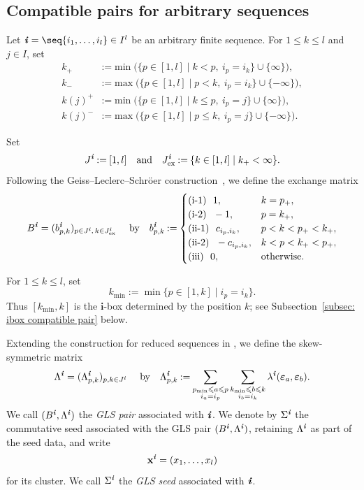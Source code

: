 \documentclass[12pt, leqno]{amsart}
\numberwithin{equation}{section}
\theoremstyle{plain}
\theoremstyle{definition}
\renewcommand{\le}{\leqslant}
\newcommand{\seteq}{\mathbin{:=}}
\newcommand{\ex}{\mathrm{ex}}
\newcommand{\ve}{\boldsymbol{\varepsilon}}
\newcommand{\ii}{ \textbf{\textit{i}}}
\newcommand{\bfi}{\mathbf{i}}
\newcommand{\bfx}{\mathbf{x}}
\newcommand{\qtq}[1][{and}]{\quad\text{{#1}}\quad}
\begin{document}
\subsection{Compatible pairs for arbitrary sequences}

Let $\ii=\seq{i_1,\ldots,i_l}\in I^l$ be an arbitrary finite sequence.
For $1\le k\le l$ and $j\in I$, set
\begin{equation}\label{eq: k pm j}
\begin{aligned}
k_+ &\seteq \min\bigl(\{p\in[1,l]\mid k<p,\ i_p=i_k\}\cup\{\infty\}\bigr),\\
k_- &\seteq \max\bigl(\{p\in[1,l]\mid p<k,\ i_p=i_k\}\cup\{-\infty\}\bigr),\\
k(j)^+ &\seteq \min\bigl(\{p\in[1,l]\mid k\le p,\ i_p=j\}\cup\{\infty\}\bigr),\\
k(j)^- &\seteq \max\bigl(\{p\in[1,l]\mid p\le k,\ i_p=j\}\cup\{-\infty\}\bigr).
\end{aligned}
\end{equation}

Set
\[
J^\ii\seteq[1,l] \qtq J^\ii_{\ex}\seteq\{k\in[1,l]\mid k_+<\infty\}.
\]
Following the Geiss--Leclerc--Schr\"oer construction~\cite{GLS08}, we define the exchange matrix
\begin{equation}\label{eq: GLS exchange matrix}
B^\ii=(b^\ii_{p,k})_{p\in J^\ii,\,k\in J^\ii_{\ex}} \quad \text{ by } \ \
b^\ii_{p,k}\seteq
\begin{cases}
{\rm (i\text{-}1)} \ \ 1, & k=p_+,\\
{\rm (i\text{-}2)} \ \ -1, & p=k_+,\\
{\rm (ii\text{-}1)} \ \ c_{i_p,i_k}, & p<k<p_+<k_+,\\
{\rm (ii\text{-}2)} \ \ -c_{i_p,i_k}, & k<p<k_+<p_+,\\
{\rm (iii)} \ \  0, & \text{otherwise}.
\end{cases}
\end{equation}

For $1\le k\le l$, set
\[
k_{\min}\seteq \min\{p\in[1,k]\mid i_p=i_k\}.
\]
Thus $[k_{\min},k]$ is the $\bfi$-box determined by the position $k$;
see Subsection~\ref{subsec: ibox compatible pair} below.

Extending the construction for reduced sequences in
\cite{KKOP24A,KKOP23F}, we define the skew-symmetric matrix
\begin{equation}\label{eq: GLS Lambda matrix}
\Lambda^\ii=(\Lambda^\ii_{p,k})_{p,k\in J^\ii} \quad
\text{ by } \ \
\Lambda^\ii_{p,k} \seteq \sum_{\substack{p_{\min}\le a\le p\\ i_a=i_p}} \sum_{\substack{k_{\min}\le b\le k\\ i_b=i_k}}
\lambda^\ii(\ve_a,\ve_b).
\end{equation}
We call $(B^\ii,\Lambda^\ii)$ the \emph{GLS pair} associated with
$\ii$.
We denote by $\Sigma^\ii$ the commutative seed associated with the GLS pair
$(B^\ii,\Lambda^\ii)$, retaining $\Lambda^\ii$ as part of the seed data, and write
\[
  \bfx^\ii=(x_1,\ldots,x_l)
\]
for its cluster.
 We call $\Sigma^\ii$ the \emph{GLS seed} associated with $\ii$.
\end{document}
